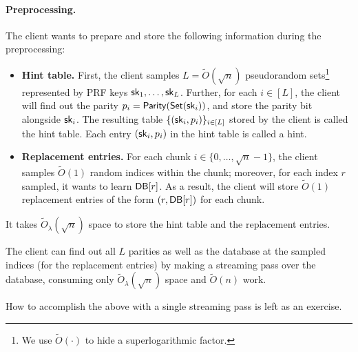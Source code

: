 \paragraph{Preprocessing.}
The client wants to prepare and store the following information during the preprocessing:  
\begin{itemize}
\item 
{\bf Hint table.}
First, the client samples
$L = \widetilde{O}(\sqrt{n})$
pseudorandom sets\footnote{We use $\widetilde{O}(\cdot)$ to hide
a superlogarithmic factor.} represented by PRF keys ${\sf sk}_1, \ldots, {\sf sk}_L$.
Further, for each $i \in [L]$, the client will 
find out the parity 
$p_i = {\sf Parity}({\sf Set}({\sf sk}_i))$, and store the parity bit alongside ${\sf sk}_i$.
The resulting table $\{({\sf sk}_i, p_i)\}_{i \in [L]}$ 
stored by the client
is called the hint table.
Each entry $({\sf sk}_i, p_i)$ in the hint table is called a hint.
\item 
{\bf Replacement entries.}
For each chunk $i \in \{0, \ldots, \sqrt{n}-1\}$, the client
samples $\widetilde{O}(1)$
random indices within the chunk; moreover, for each index $r$ sampled,
it wants to learn ${\sf DB}[r]$.  
As a result, the client will store $\widetilde{O}(1)$
replacement entries of the form $(r, {\sf DB}[r])$ for each chunk. 
\end{itemize}

It takes $\widetilde{O}_\lambda(\sqrt{n})$ space to
store the hint table and the replacement entries.

\begin{claim}
The client can find out all $L$ parities
as well as
the database at the sampled indices (for the replacement entries)
by making a streaming pass over the database, consuming
only $\widetilde{O}_\lambda(\sqrt{n})$ space and $\widetilde{O}(n)$ work.
\end{claim}
How to accomplish the above with a single streaming pass is left as an exercise.

